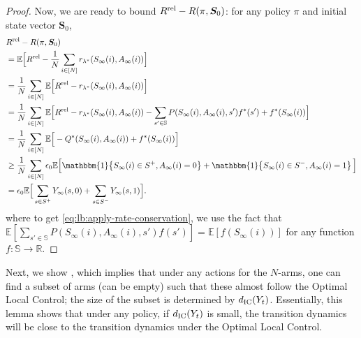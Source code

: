 \documentclass[11pt,letterpaper]{article}
\theoremstyle{plain}
\theoremstyle{definition}
\theoremstyle{remark}
\newcommand{\Eplain}[1]{\mathbb{E}[#1]}
\newcommand{\EBig}[1]{\mathbb{E}\Big[#1\Big]}
\newcommand{\R}{\mathbb{R}}
\newcommand{\indibrac}[1]{\mathbbm{1}\!\left\{#1\right\}}
\newcommand{\ve}[1]{\bm{#1}}
\newcommand{\veS}{\ve{S}}
\newcommand{\sspa}{\mathbb{S}}
\newcommand{\sumN}{\sum_{i\in[N]}}
\newcommand{\rel}{\textup{rel}} %
\newcommand{\ravg}{R}
\newcommand{\rsysn}{\ravg(\pi, \veS_0)}
\newcommand{\rrel}{\ravg^\rel}
\newcommand{\vlam}{f^*}
\newcommand{\qlam}{Q^*}
\newcommand{\rlam}{r_{\lambda^*}}
\newcommand{\rewardgap}{\epsilon_0}
\newcommand{\disy}{d_{\textup{IC}}}
\begin{document}
\begin{proof}
    Now, we are ready to bound $\rrel - \rsysn$: for any policy $\pi$ and initial state vector $\veS_0$,
    \begin{align}
        \nonumber
        &\rrel - \rsysn\\
        \nonumber 
        &=  \EBig{\rrel - \frac{1}{N} \sumN \rlam(S_\infty(i), A_\infty(i))} \\
        \nonumber
        &= \frac{1}{N} \sumN \EBig{\rrel - \rlam(S_\infty(i), A_\infty(i))} \\
        \label{eq:lb:apply-rate-conservation}
        &=  \frac{1}{N}\sumN \EBig{\rrel -  \rlam(S_\infty(i), A_\infty(i)) - \sum_{s'\in\sspa}P(S_\infty(i),A_\infty(i),s')\vlam(s') + \vlam(S_\infty(i))} \\
        \nonumber
        &= \frac{1}{N}\sumN \EBig{-\qlam(S_\infty(i), A_\infty(i)) + \vlam(S_\infty(i))}\\
        \label{eq:lb:apply-action-gap}
        &\geq  \frac{1}{N}\sumN \rewardgap \EBig{\indibrac{S_\infty(i)\in S^+, A_\infty(i) = 0} + \indibrac{S_\infty(i)\in S^-, A_\infty(i) = 1}} \\
        &= \rewardgap \EBig{\sum_{s\in S^+} Y_\infty(s,0) + \sum_{s\in S^-} Y_\infty(s,1)}. 
    \end{align}
    where to get \eqref{eq:lb:apply-rate-conservation}, we use the fact that  $\Eplain{\sum_{s'\in\sspa}P(S_\infty(i),A_\infty(i),s')f(s')}=\Eplain{f(S_\infty(i))}$ for any function $f\colon\sspa\to\R$. 
\end{proof}


Next, we show , which implies that under any actions for the $N$-arms, one can find a subset of arms (can be empty) such that these almost follow the Optimal Local Control; the size of the subset is determined by $\disy(Y_t)$. 
Essentially, this lemma shows that under any policy, if $\disy(Y_t)$ is small, the transition dynamics will be close to the transition dynamics under the Optimal Local Control. 
\end{document}
